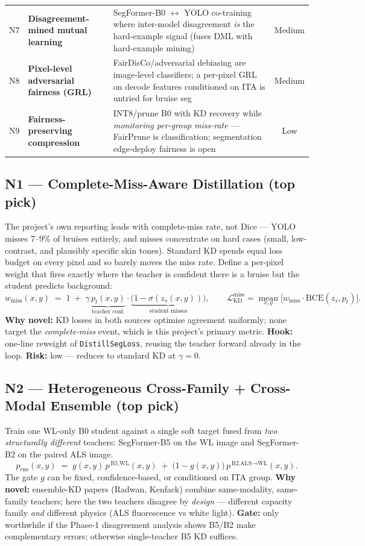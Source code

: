 \documentclass[11pt]{article}
\newcommand{\novel}[1]{\textcolor{noveltygreen}{\textbf{#1}}}
\begin{document}
\begin{center}
\begin{longtable}{@{}p{0.4cm} P{5.3cm} P{5.5cm} c@{}}
N7 & \novel{Disagreement-mined mutual learning} & SegFormer-B0 $\leftrightarrow$ YOLO co-training where inter-model disagreement \emph{is} the hard-example signal (fuses DML with hard-example mining) & Medium \\
N8 & \novel{Pixel-level adversarial fairness (GRL)} & FairDisCo/adversarial debiasing are image-level classifiers; a per-pixel GRL on decode features conditioned on ITA is untried for bruise seg & Medium \\
N9 & \novel{Fairness-preserving compression} & INT8/prune B0 with KD recovery while \emph{monitoring per-group miss-rate} --- FairPrune is classification; segmentation edge-deploy fairness is open & Low \\
\bottomrule
\end{longtable}
\end{center}

\subsection{N1 --- Complete-Miss-Aware Distillation \novel{(top pick)}}
The project's own reporting leads with complete-miss rate, not Dice --- YOLO misses 7--9\% of
bruises entirely, and misses concentrate on hard cases (small, low-contrast, and plausibly
specific skin tones). Standard KD spends equal loss budget on every pixel and so barely moves
the miss rate. Define a per-pixel weight that fires exactly where the teacher is confident there
is a bruise but the student predicts background:
\[
w_{\text{miss}}(x,y) \;=\; 1 \;+\; \gamma\,\underbrace{p_t(x,y)}_{\text{teacher conf.}}\cdot
\underbrace{\big(1-\sigma(z_s(x,y))\big)}_{\text{student misses}},\qquad
\mathcal{L}^{\text{miss}}_{\text{KD}} = \operatorname*{mean}_{x,y}\big[w_{\text{miss}}\cdot\mathrm{BCE}(z_s,p_t)\big].
\]
\textbf{Why novel:} KD losses in both sources optimise agreement uniformly; none target the
\emph{complete-miss} event, which is this project's primary metric. \textbf{Hook:} one-line
reweight of \texttt{DistillSegLoss}, reusing the teacher forward already in the loop. \textbf{Risk:}
low --- reduces to standard KD at $\gamma{=}0$.

\subsection{N2 --- Heterogeneous Cross-Family + Cross-Modal Ensemble \novel{(top pick)}}
Train one WL-only B0 student against a single soft target fused from \emph{two structurally
different} teachers: SegFormer-B5 on the WL image and SegFormer-B2 on the paired ALS image.
\[
p_{\text{ens}}(x,y) \;=\; g(x,y)\,p^{\,\text{B5,WL}}(x,y) \;+\; \big(1-g(x,y)\big)\,p^{\,\text{B2,ALS}\to\text{WL}}(x,y).
\]
The gate $g$ can be fixed, confidence-based, or conditioned on ITA group. \textbf{Why novel:}
ensemble-KD papers (Radwan, Kenfack) combine same-modality, same-family teachers; here the two
teachers disagree by \emph{design} --- different capacity family \emph{and} different physics
(ALS fluorescence vs white light). \textbf{Gate:} only worthwhile if the Phase-1 disagreement
analysis shows B5/B2 make complementary errors; otherwise single-teacher B5 KD suffices.
\end{document}
